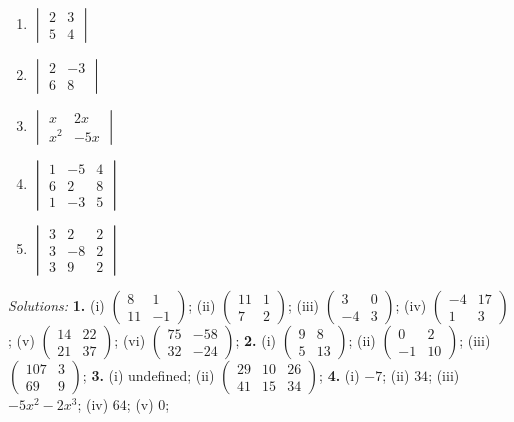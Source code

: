 \documentclass[
  12pt,
  oneside]{book}
\providecommand{\tightlist}{%
  \setlength{\itemsep}{0pt}\setlength{\parskip}{0pt}}
\theoremstyle{definition}
\theoremstyle{definition}
\theoremstyle{definition}
\theoremstyle{definition}
\theoremstyle{remark}
\begin{document}
\begin{enumerate}
  \begin{enumerate}
  \def\labelenumii{\roman{enumii})}
  \tightlist
  \item
    \(\begin{vmatrix}2&3\\5&4\end{vmatrix}\)
  \item
    \(\begin{vmatrix}2&-3\\6&8\end{vmatrix}\)
  \item
    \(\begin{vmatrix}x&2x\\x^2&-5x\end{vmatrix}\)
  \item
    \(\begin{vmatrix}1&-5&4\\6&2&8\\1&-3&5\end{vmatrix}\)
  \item
    \(\begin{vmatrix}3&2&2\\3&-8&2\\3&9&2\end{vmatrix}\)
  \end{enumerate}
\end{enumerate}

\emph{Solutions:}
\textbf{1.} (i) \(\begin{pmatrix}8&1\\11&-1\end{pmatrix}\);
(ii) \(\begin{pmatrix}11&1\\7&2\end{pmatrix}\);
(iii) \(\begin{pmatrix}3&0\\-4&3\end{pmatrix}\);
(iv) \(\begin{pmatrix}-4&17\\1&3\end{pmatrix}\);
(v) \(\begin{pmatrix}14&22\\21&37\end{pmatrix}\);
(vi) \(\begin{pmatrix}75&-58\\32&-24\end{pmatrix}\);
\textbf{2.} (i) \(\begin{pmatrix}9&8\\5&13\end{pmatrix}\);
(ii) \(\begin{pmatrix}0&2\\-1&10\end{pmatrix}\);
(iii) \(\begin{pmatrix}107&3\\69&9\end{pmatrix}\);
\textbf{3.} (i) undefined; (ii) \(\begin{pmatrix}29&10&26\\41&15&34\end{pmatrix}\);
\textbf{4.} (i) \(-7\); (ii) \(34\); (iii) \(-5x^2-2x^3\); (iv) \(64\); (v) \(0\);
\end{document}
